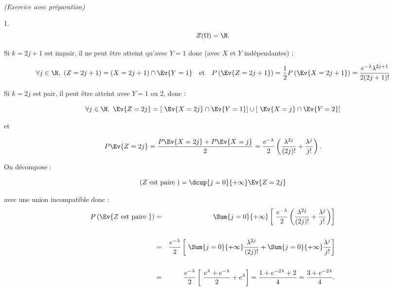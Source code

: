 \documentclass[11pt]{article}%
\begin{document}
\begin{exercice}{\it (Exercice avec préparation)}
\begin{noliste}{1.}
\[
 Z ( \Omega ) = \N. 
\]

 Si $k = 2 j + 1$ est impair, il ne peut être atteint qu'avec $Y = 1$
donc (avec $X$ et $Y$ indépendantes) : 
 
\[
 \forall j \in \N, \ ( Z = 2 j + 1 ) = (X = 2 j + 1 ) \cap \Ev{Y = 1 }
\ \ \text{ et } \ \ P \left(\Ev{ Z = 2 j + 1 }\right) = \frac{ 1 }{ 2 }
P \left(\Ev{ X = 2 j + 1 }\right) = \frac{ e^{ - \lambda } \lambda^{ 2j
+ 1 } }{ 2 (2j + 1)! } 
\]

 Si $k = 2j$ est pair, il peut être atteint avec $Y = 1$ ou 2, donc : 
 
\[
 \forall j \in \N, \ \Ev{ Z = 2 j } = [ \ \Ev{ X = 2j } \cap \Ev{ Y = 1
} ] \cup [ \ \Ev{ X = j } \cap \Ev{ Y = 2 } ] 
\]


 et
 
\[
 P \Ev{ Z = 2j } = \frac{ P \Ev{ X = 2j } + P \Ev{ X = j } }{ 2 } =
\frac{ e^{ - \lambda } }{ 2 } \left( \frac{ \lambda^{ 2j } }{ (2j)! } +
\frac{ \lambda^{j} }{ j! } \right). 
\]

 \item On décompose : 
 
\[
 (Z \text{ est paire } ) = \dcup{j = 0}{+ \infty} \Ev{Z = 2j } 
\]

 avec une union incompatible donc : 
 \begin{eqnarray*}
 P \left(\Ev{ Z \text{ est paire } }\right) & = & \Sum{j = 0}{+ \infty}
\left[ \ \frac{ e^{ - \lambda } }{ 2 } \left( \frac{ \lambda^{ 2j } }{
(2j)! } + \frac{ \lambda^{j} }{ j! } \right) \right] \\
\\
 & = & \frac{ e^{ - \lambda } }{ 2 } \left[ \ \Sum{j = 0}{+ \infty}
\frac{ \lambda^{ 2j } }{ (2j)! } + \Sum{j = 0}{+ \infty} \frac{
\lambda^{j} }{ j! } \right] \\
\\
 & = & \frac{ e^{ - \lambda } }{ 2 } \left[ \ \frac{ e^{ \lambda } +
e^{ - \lambda } }{ 2 } + e^{ \lambda } \right] = \frac{ 1 + e^{ - 2
\lambda } + 2 }{ 4 } = \frac{ 3 + e^{ - 2 \lambda } }{ 4 }. \end{eqnarray*}

 \end{noliste}
 \end{exercice}

 \newpage
\end{document}
